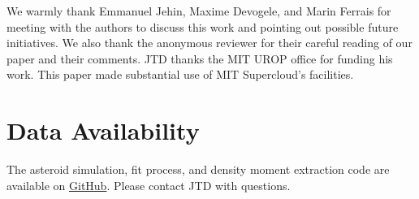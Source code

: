 \documentclass[fleqn,usenatbib]{mnras}
\begin{document}
We warmly thank Emmanuel Jehin, Maxime Devogele, and Marin Ferrais for meeting with the authors to discuss this work and pointing out possible future initiatives. We also thank the anonymous reviewer for their careful reading of our paper and their comments. JTD thanks the MIT UROP office for funding his work. This paper made substantial use of MIT Supercloud's facilities.



\section*{Data Availability}

The asteroid simulation, fit process, and density moment extraction code are available on \href{https://github.com/jack-dinsmore/asteroid-tidal-torque}{GitHub}. Please contact JTD with questions.










\bsp
\label{lastpage}
\end{document}
